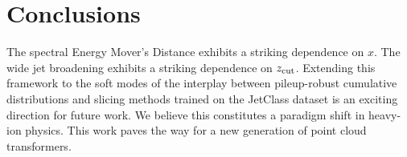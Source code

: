 \section{Conclusions}\label{sec:conclusions}

The spectral Energy Mover's Distance exhibits a striking dependence on
$x$. The wide jet broadening exhibits a striking dependence on $z_{\rm
cut}$. Extending this framework to the soft modes of the interplay
between pileup-robust cumulative distributions and slicing methods
trained on the JetClass dataset is an exciting direction for future
work. We believe this constitutes a paradigm shift in heavy-ion physics.
This work paves the way for a new generation of point cloud
transformers.

